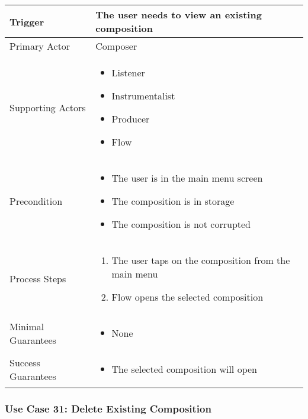   \begin{tabularx}{\textwidth}{|X|X|}
  \hline
  Trigger & 
  The user needs to view an existing composition \\
  \hline
  Primary Actor & 
  Composer \\
  \hline
  Supporting Actors & 
  \begin{itemize}
  \item Listener
  \item Instrumentalist
  \item Producer
  \item Flow
  \end{itemize} \\
  \hline
  Precondition & 
  \begin{itemize}
  \item The user is in the main menu screen
  \item The composition is in storage
  \item The composition is not corrupted
  \end{itemize} \\
  \hline
  Process Steps & 
  \begin{enumerate}
  \item The user taps on the composition from the main menu
  \item Flow opens the selected composition
  \end{enumerate} \\
  \hline
  Minimal Guarantees & 
  \begin{itemize}
    \item None
  \end{itemize} \\
  \hline
  Success Guarantees & 
  \begin{itemize}
    \item The selected composition will open
  \end{itemize} \\
  \hline
  \end{tabularx}

  \subsubsection{Use Case 31: Delete Existing Composition}

